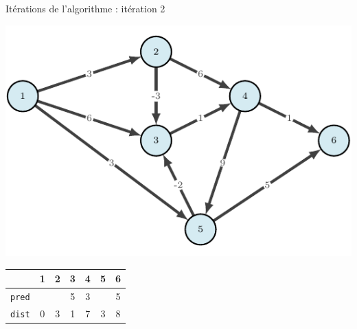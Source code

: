 \begin{frame}{Itérations de l'algorithme : itération 2}
    \begin{center}
        \includegraphics[height=.6\textheight]{fig/bellmann-0.pdf}      
    \begin{tabular}{c|cccccc}
      
        & 1    &2      &3      &4      &5      &6      \\
        \hline
        \texttt{pred} & &       &5      &3      &       &5      \\
        \texttt{dist} & 0       &3      &1      &7      &3      &8      \\
        
    \end{tabular}
\end{center}
\end{frame}

